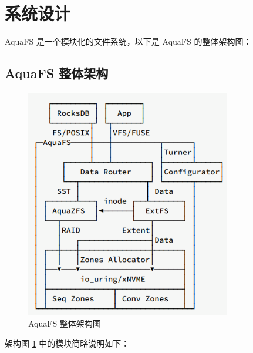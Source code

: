 \section{系统设计}

AquaFS 是一个模块化的文件系统，以下是 AquaFS 的整体架构图：

\subsection{AquaFS 整体架构}

\begin{figure}[H]
    \centering
    \includegraphics[width=0.8\textwidth]{fig/aquafs-frame.png}
    \caption{AquaFS 整体架构图}
    \label{aquafs-frame}
\end{figure}

架构图 \ref{aquafs-frame} 中的模块简略说明如下：

